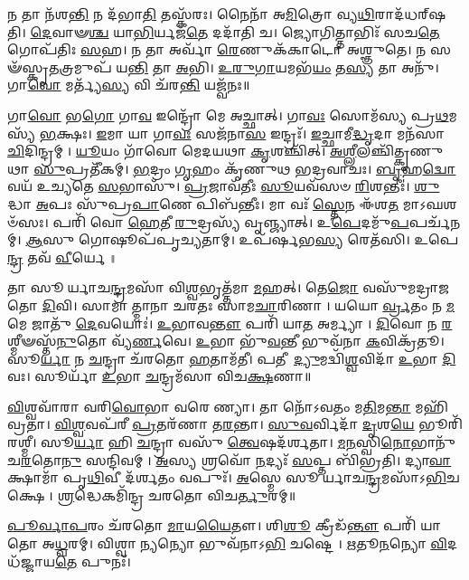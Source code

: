 𑌨 𑌤𑌾 𑌨᳴𑌶\-\ul{𑌨𑍍𑌤𑌿} 𑌨 𑌦᳴𑌭𑌾\-\ul{𑌤𑌿} 𑌤𑌸𑍍𑌕᳴𑌰𑌃।
𑌨𑍈𑌨𑌾᳴ 𑌅\-\ul{𑌮𑌿}\-𑌤𑍍𑌰𑍋 𑌵𑍍𑌯\-\ul{𑌥𑌿}\-𑌰𑌾𑌦᳴𑌧𑌰𑍍‌𑌷𑌤𑌿।
\-\ul{𑌦𑍇}\-𑌵𑌾𑍟\-\ul{𑌶𑍍𑌚} 𑌯𑌾\-\ul{𑌭𑌿}\-𑌰𑍍𑌯𑌜᳴\-\ul{𑌤𑍇} 𑌦𑌦𑌾᳴𑌤𑌿 𑌚।
𑌜𑍍𑌯𑍋𑌗𑌿𑌤𑍍𑌤𑌾𑌭𑌿𑌃᳴ 𑌸𑌚\-\ul{𑌤𑍇} 𑌗𑍋𑌪᳴𑌤𑌿𑌃 \ul{𑌸}\-𑌹।
𑌨 𑌤𑌾 𑌅𑌰𑍍𑌵𑌾᳴ \ul{𑌰𑍇}\-𑌣𑍁𑌕᳴𑌕𑌾𑌟𑍋 𑌅𑌶𑍍𑌞𑍁𑌤𑍇।
𑌨 𑌸𑍟᳴𑌸𑍍𑌕𑍃\-\ul{𑌤}\-𑌤𑍍𑌰𑌮𑍁𑌪᳴ 𑌯\-\ul{𑌨𑍍𑌤𑌿} 𑌤𑌾 \ul{𑌅}\-𑌭𑌿।
\-\ul{𑌉}\-\-\ul{𑌰𑍁}\-\-\ul{𑌗𑌾}\-𑌯𑌮𑌭᳴\-\ul{𑌯𑌂} 𑌤\-\ul{𑌸𑍍𑌯} 𑌤𑌾 𑌅𑌨𑍁᳴।
𑌗𑌾\-\ul{𑌵𑍋} 𑌮𑌰𑍍𑌤𑍍𑌯᳴\-\ul{𑌸𑍍𑌯} 𑌵𑌿 𑌚᳴𑌰\-\ul{𑌨𑍍𑌤𑌿} 𑌯𑌜𑍍𑌵᳴𑌨𑌃॥

𑌗𑌾\-\ul{𑌵𑍋} 𑌭\-\ul{𑌗𑍋} 𑌗𑌾\-\ul{𑌵} 𑌇𑌨𑍍𑌦𑍍𑌰𑍋᳴ 𑌮𑍇 𑌅𑌚𑍍𑌛𑌾𑌤𑍍।
𑌗𑌾\-\ul{𑌵𑌃} 𑌸𑍋𑌮᳴𑌸𑍍𑌯 𑌪𑍍𑌰\-\ul{𑌥}\-𑌮𑌸𑍍𑌯᳴ \ul{𑌭}\-𑌕𑍍𑌷𑌃।
\-\ul{𑌇}\-𑌮𑌾 𑌯𑌾 𑌗𑌾\-\ul{𑌵𑌃} 𑌸𑌜᳴𑌨𑌾\-\ul{𑌸} 𑌇𑌨𑍍𑌦𑍍𑌰𑌃᳴।
\-\ul{𑌇}\-𑌚𑍍𑌛𑌾𑌮𑍀\-\ul{𑌦𑍍𑌧𑍃}\-𑌦𑌾 𑌮𑌨᳴𑌸𑌾 \ul{𑌚𑌿}\-𑌦𑌿𑌨𑍍𑌦𑍍𑌰𑌮𑍍।
\-\ul{𑌯𑍂}\-𑌯𑌂 𑌗𑌾᳴𑌵𑍋 𑌮𑍇𑌦𑌯𑌥𑌾 \ul{𑌕𑍃}\-𑌶𑌞𑍍𑌚𑌿᳴𑌤𑍍।
\-\ul{𑌅}\-\-\ul{𑌶𑍍𑌲𑍀}\-𑌲𑌞𑍍𑌚𑌿᳴𑌤𑍍𑌕𑍃𑌣𑍁𑌥𑌾 \ul{𑌸𑍁}\-𑌪𑍍𑌰𑌤𑍀᳴𑌕𑌮𑍍।
\-\ul{𑌭}\-𑌦𑍍𑌰𑌂 \ul{𑌗𑍃}\-𑌹𑌂 𑌕𑍃᳴𑌣𑍁𑌥 𑌭𑌦𑍍𑌰𑌵𑌾𑌚𑌃।
\-\ul{𑌬𑍃}\-𑌹\-\ul{𑌦𑍍𑌵𑍋} 𑌵𑌯᳴ 𑌉𑌚𑍍𑌯𑌤𑍇 \ul{𑌸}\-𑌭𑌾𑌸𑍁᳴।
\-\ul{𑌪𑍍𑌰}\-𑌜𑌾𑌵᳴𑌤𑍀𑌃 \ul{𑌸𑍂}\-𑌯𑌵᳴𑌸𑍞 \ul{𑌰𑌿}\-𑌶𑌨𑍍𑌤𑍀𑌃॑।
\-\ul{𑌶𑍁}\-𑌦𑍍𑌧𑌾 \ul{𑌅}\-𑌪𑌃 𑌸𑍁᳴𑌪𑍍𑌰\-\ul{𑌪𑌾}\-𑌣𑍇 𑌪𑌿𑌬᳴𑌨𑍍𑌤𑍀𑌃।
𑌮𑌾 𑌵𑌃᳴ \ul{𑌸𑍍𑌤𑍇}\-𑌨 𑌈᳴𑌶\-\ul{𑌤} 𑌮𑌾𑌽𑌘𑌶𑍞᳴𑌸𑌃।
𑌪𑌰𑌿᳴ 𑌵𑍋 \ul{𑌹𑍇}\-𑌤𑍀 \ul{𑌰𑍁}\-𑌦𑍍𑌰𑌸𑍍𑌯᳴ 𑌵𑍃𑌞𑍍𑌜𑍍𑌯𑌾𑌤𑍍।
𑌉\-\ul{𑌪𑍇}\-𑌦𑌮𑍁᳴\-\ul{𑌪}\-𑌪𑌰𑍍𑌚᳴𑌨𑌮𑍍।
\-\ul{𑌆}\-𑌸𑍁 𑌗𑍋𑌷𑍂𑌪᳴𑌪𑍃𑌚𑍍𑌯𑌤𑌾𑌮𑍍।
𑌉𑌪᳴𑌰𑍍\mbox{}\-\ul{𑌷}\-𑌭\-\ul{𑌸𑍍𑌯} 𑌰𑍇𑌤᳴𑌸𑌿।
𑌉𑌪𑍇\-\ul{𑌨𑍍𑌦𑍍𑌰} 𑌤𑌵᳴ \ul{𑌵𑍀}\-𑌰𑍍𑌯𑍇॥

𑌤𑌾 𑌸𑍂𑌰𑍍𑌯𑌾𑌚\-\ul{𑌨𑍍𑌦𑍍𑌰}\-𑌮𑌸𑌾᳴ 𑌵𑌿\-\ul{𑌶𑍍𑌵}\-𑌭𑍃𑌤𑍍𑌤᳴𑌮𑌾 \ul{𑌮}\-𑌹𑌤𑍍।
𑌤𑍇\-\ul{𑌜𑍋} 𑌵𑌸𑍁᳴𑌮𑌦𑍍𑌰𑌾𑌜𑌤𑍋 \ul{𑌦𑌿}\-𑌵𑌿।
𑌸𑌾𑌮𑌾𑌤𑍍𑌮𑌾𑌨𑌾 𑌚𑌰𑌤𑌃 𑌸𑌾𑌮\-\ul{𑌚𑌾}\-𑌰𑌿𑌣𑌾।
𑌯𑌯𑍋\-\ul{𑌰𑍍𑌵𑍍𑌰}\-𑌤𑌂 𑌨 \ul{𑌮}\-𑌮𑍇 𑌜𑌾𑌤𑍁᳴ \ul{𑌦𑍇}\-𑌵𑌯𑍋𑌃॑।
\-\ul{𑌉}\-𑌭𑌾𑌵\-\ul{𑌨𑍍𑌤𑍗} 𑌪𑌰𑌿᳴ 𑌯𑌾\-\ul{𑌤} 𑌅𑌰𑍍𑌮𑍍𑌯𑌾।
\-\ul{𑌦𑌿}\-𑌵𑍋 𑌨 \ul{𑌰}\-𑌶𑍍𑌮𑍀𑍟𑌸𑍍𑌤᳴\-\ul{𑌨𑍁}\-𑌤𑍋 𑌵𑍍𑌯᳴\-\ul{𑌰𑍍𑌣}\-𑌵𑍇।
\-\ul{𑌉}\-𑌭𑌾 𑌭𑍁᳴\-\ul{𑌵}\-𑌨𑍍𑌤𑍀 𑌭𑍁𑌵᳴𑌨𑌾 \ul{𑌕}\-𑌵𑌿𑌕𑍍𑌰᳴𑌤𑍂।
𑌸𑍂\-\ul{𑌰𑍍𑌯𑌾} 𑌨 \ul{𑌚}\-𑌨𑍍𑌦𑍍𑌰𑌾 𑌚᳴𑌰𑌤𑍋 \ul{𑌹}\-𑌤𑌾𑌮᳴𑌤𑍀।
𑌪𑌤𑍀 \ul{𑌦𑍍𑌯𑍁}\-𑌮𑌦𑍍𑌵𑌿᳴\-\ul{𑌶𑍍𑌵}\-𑌵𑌿𑌦𑌾᳴ \ul{𑌉}\-𑌭𑌾 \ul{𑌦𑌿}\-𑌵𑌃।
𑌸𑍂𑌰𑍍𑌯𑌾᳴ \ul{𑌉}\-𑌭𑌾 \ul{𑌚}\-𑌨𑍍𑌦𑍍𑌰𑌮᳴𑌸𑌾 𑌵𑌿𑌚\-\ul{𑌕𑍍𑌷}\-𑌣𑌾॥

\-\ul{𑌵𑌿}\-𑌶𑍍𑌵𑌵𑌾᳴𑌰𑌾 𑌵𑌰𑌿\-\ul{𑌵𑍋}\-𑌭𑌾 𑌵𑌰𑍇𑌣𑍍𑌯𑌾।
𑌤𑌾 𑌨𑍋᳴𑌽𑌵𑌤𑌂 𑌮\-\ul{𑌤𑌿}\-𑌮\-\ul{𑌨𑍍𑌤𑌾} 𑌮𑌹𑌿᳴𑌵𑍍𑌰𑌤𑌾।
\-\ul{𑌵𑌿}\-\-\ul{𑌶𑍍𑌵}\-𑌵𑌪᳴𑌰𑍀 \ul{𑌪𑍍𑌰}\-𑌤𑌰᳴𑌣𑌾 𑌤\-\ul{𑌰}\-𑌨𑍍𑌤𑌾।
\-\ul{𑌸𑍁}\-\-\ul{𑌵}\-𑌰𑍍𑌵𑌿𑌦𑌾᳴ \ul{𑌦𑍃}\-𑌶\-\ul{𑌯𑍇} 𑌭𑍂𑌰𑌿᳴𑌰𑌶𑍍𑌮𑍀।
𑌸𑍂\-\ul{𑌰𑍍𑌯𑌾} 𑌹𑌿 \ul{𑌚}\-𑌨𑍍𑌦𑍍𑌰𑌾 𑌵𑌸𑍁᳴ \ul{𑌤𑍍𑌵𑍇}\-𑌷𑌦᳴𑌰𑍍\mbox{}𑌶𑌤𑌾।
\-\ul{𑌮}\-\-\ul{𑌨}\-𑌸𑍍𑌵𑌿\-\ul{𑌨𑍋}\-𑌭𑌾𑌨𑍁᳴𑌚\-\ul{𑌰}\-𑌤𑍋\-\ul{𑌨𑍁} 𑌸𑌨𑍍𑌦𑌿𑌵𑌮𑍍।
\-\ul{𑌅}\-𑌸𑍍𑌯 𑌶𑍍𑌰𑌵𑍋᳴ \ul{𑌨}\-𑌦𑍍𑌯𑌃᳴ \ul{𑌸}\-𑌪𑍍𑌤 𑌬𑌿᳴𑌭𑍍𑌰𑌤𑌿।
𑌦𑍍𑌯𑌾\-\ul{𑌵𑌾} 𑌕𑍍𑌷𑌾𑌮𑌾᳴ 𑌪𑍃\-\ul{𑌥𑌿}\-𑌵𑍀 𑌦᳴𑌰𑍍\mbox{}\-\ul{𑌶}\-𑌤𑌂 𑌵𑌪𑍁𑌃᳴।
\-\ul{𑌅}\-𑌸𑍍𑌮𑍇 𑌸𑍂𑌰𑍍𑌯𑌾𑌚\-\ul{𑌨𑍍𑌦𑍍𑌰}\-𑌮𑌸𑌾᳴𑌽\-\ul{𑌭𑌿}\-𑌚𑌕𑍍𑌷𑍇।
\-\ul{𑌶𑍍𑌰}\-𑌦𑍍𑌧𑍇𑌕𑌮𑌿᳴𑌨𑍍𑌦𑍍𑌰 𑌚𑌰𑌤𑍋 𑌵𑌿𑌚\-\ul{𑌰𑍍𑌤𑍁}\-𑌰𑌮𑍍॥

\-\ul{𑌪𑍂}\-\-\ul{𑌰𑍍𑌵𑌾}\-\-\ul{𑌪}\-𑌰𑌂 𑌚᳴𑌰𑌤𑍋 \ul{𑌮𑌾}\-𑌯\-\ul{𑌯𑍈}\-𑌤𑍗।
𑌶𑌿\-\ul{𑌶𑍂} 𑌕𑍍𑌰𑍀𑌡᳴\-\ul{𑌨𑍍𑌤𑍗} 𑌪𑌰𑌿᳴ 𑌯𑌾𑌤𑍋 𑌅\-\ul{𑌧𑍍𑌵}\-𑌰𑌮𑍍।
𑌵𑌿𑌶𑍍𑌵𑌾\-\ul{𑌨𑍍𑌯}\-𑌨𑍍𑌯𑍋 𑌭𑍁𑌵᳴𑌨𑌾𑌽\-\ul{𑌭𑌿} 𑌚𑌷𑍍𑌟𑍇।
\-\ul{𑌋}\-𑌤𑍂\-\ul{𑌨}\-𑌨𑍍𑌯𑍋 \ul{𑌵𑌿}\-𑌦𑌧᳴𑌜𑍍𑌜𑌾𑌯\-\ul{𑌤𑍇} 𑌪𑍁𑌨𑌃᳴।

